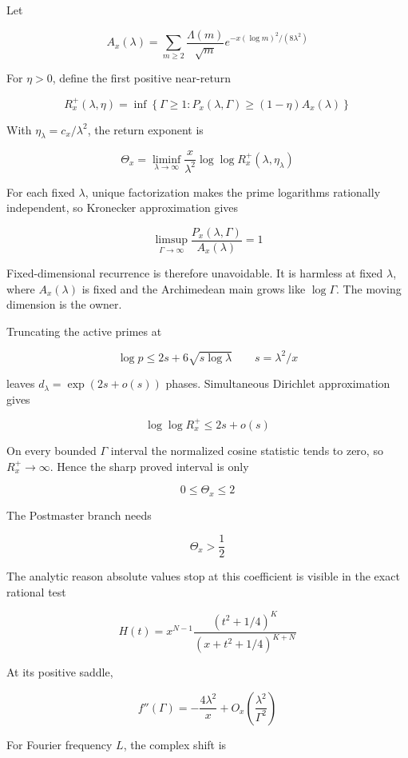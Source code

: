 \documentclass[
  11pt,
]{book}
\begin{document}
Let

\[
A_x(\lambda)
=\sum_{m\ge2}
\frac{\Lambda(m)}{\sqrt m}
e^{-x(\log m)^2/(8\lambda^2)}
\tag{106.1}
\]

For \(\eta>0\), define the first positive near-return

\[
R_x^+(\lambda,\eta)
=\inf\left\{
\Gamma\ge1:
P_x(\lambda,\Gamma)\ge(1-\eta)A_x(\lambda)
\right\}
\tag{106.2}
\]

With \(\eta_\lambda=c_x/\lambda^2\), the return exponent is

\[
\boxed{
\Theta_x
=\liminf_{\lambda\to\infty}
\frac{x}{\lambda^2}
\log\log R_x^+(\lambda,\eta_\lambda)
}
\tag{106.3}
\]

For each fixed \(\lambda\), unique factorization makes the prime
logarithms rationally independent, so Kronecker approximation gives

\[
\limsup_{\Gamma\to\infty}
\frac{P_x(\lambda,\Gamma)}{A_x(\lambda)}=1
\tag{106.4}
\]

Fixed-dimensional recurrence is therefore unavoidable. It is harmless at
fixed \(\lambda\), where \(A_x(\lambda)\) is fixed and the Archimedean
main grows like \(\log\Gamma\). The moving dimension is the owner.

Truncating the active primes at

\[
\log p
\le2s+6\sqrt{s\log\lambda}
\qquad s=\lambda^2/x
\tag{106.5}
\]

leaves \(d_\lambda=\exp(2s+o(s))\) phases. Simultaneous Dirichlet
approximation gives

\[
\log\log R_x^+
\le2s+o(s)
\tag{106.6}
\]

On every bounded \(\Gamma\) interval the normalized cosine statistic
tends to zero, so \(R_x^+\to\infty\). Hence the sharp proved interval is
only

\[
\boxed{0\le\Theta_x\le2}
\tag{106.7}
\]

The Postmaster branch needs

\[
\boxed{\Theta_x>\frac12}
\tag{106.8}
\]

The analytic reason absolute values stop at this coefficient is visible
in the exact rational test

\[
H(t)
=x^{N-1}
\frac{(t^2+1/4)^K}
{(x+t^2+1/4)^{K+N}}
\tag{106.9}
\]

At its positive saddle,

\[
f''(\Gamma)
=-\frac{4\lambda^2}{x}
+O_x\!\left(\frac{\lambda^2}{\Gamma^2}\right)
\tag{106.10}
\]

For Fourier frequency \(L\), the complex shift is
\end{document}
